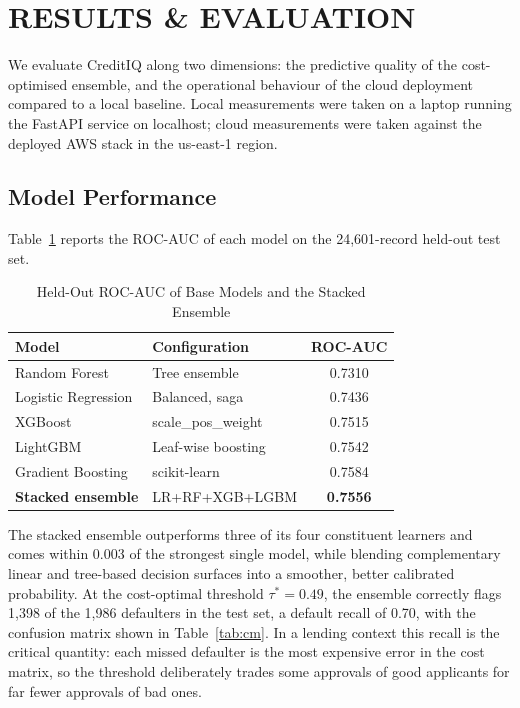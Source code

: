 \documentclass[conference]{IEEEtran}
\begin{document}
\section{RESULTS \& EVALUATION}
\label{sec:results}
We evaluate CreditIQ along two dimensions: the predictive quality of the cost-optimised ensemble, and the operational behaviour of the cloud deployment compared to a local baseline. Local measurements were taken on a laptop running the FastAPI service on localhost; cloud measurements were taken against the deployed AWS stack in the us-east-1 region.

\subsection{Model Performance}
Table~\ref{tab:models} reports the ROC-AUC of each model on the 24,601-record held-out test set.

\begin{table}[htbp]
\caption{Held-Out ROC-AUC of Base Models and the Stacked Ensemble}
\begin{center}
\begin{tabular}{|l|l|c|}
\hline
\textbf{Model} & \textbf{Configuration} & \textbf{ROC-AUC} \\
\hline
Random Forest & Tree ensemble & 0.7310 \\
Logistic Regression & Balanced, saga & 0.7436 \\
XGBoost & scale\_pos\_weight & 0.7515 \\
LightGBM & Leaf-wise boosting & 0.7542 \\
Gradient Boosting & scikit-learn & 0.7584 \\
\textbf{Stacked ensemble} & LR+RF+XGB+LGBM & \textbf{0.7556} \\
\hline
\end{tabular}
\label{tab:models}
\end{center}
\end{table}

The stacked ensemble outperforms three of its four constituent learners and comes within 0.003 of the strongest single model, while blending complementary linear and tree-based decision surfaces into a smoother, better calibrated probability. At the cost-optimal threshold $\tau^{*} = 0.49$, the ensemble correctly flags 1,398 of the 1,986 defaulters in the test set, a default recall of 0.70, with the confusion matrix shown in Table~\ref{tab:cm}. In a lending context this recall is the critical quantity: each missed defaulter is the most expensive error in the cost matrix, so the threshold deliberately trades some approvals of good applicants for far fewer approvals of bad ones.
\end{document}
